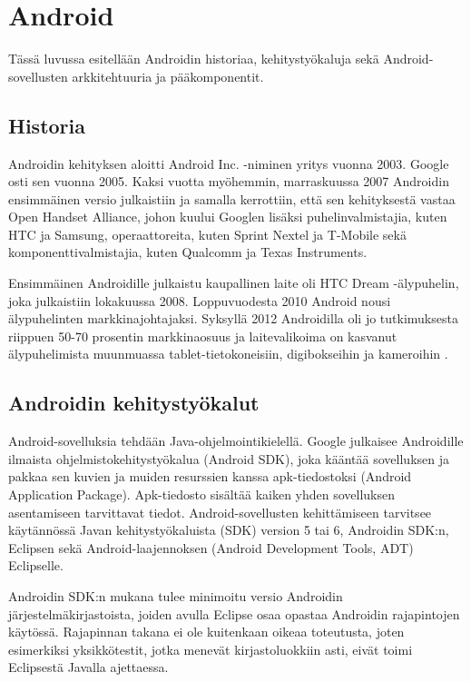 \section{Android}

Tässä luvussa esitellään Androidin historiaa, kehitystyökaluja sekä Android-sovellusten arkkitehtuuria ja pääkomponentit.

\subsection{Historia}

Androidin kehityksen aloitti Android Inc. -niminen yritys vuonna 2003. Google osti sen vuonna 2005. Kaksi vuotta myöhemmin, marraskuussa 2007 Androidin ensimmäinen versio julkaistiin ja samalla kerrottiin, että sen kehityksestä vastaa Open Handset Alliance, johon kuului Googlen lisäksi puhelinvalmistajia, kuten HTC ja Samsung, operaattoreita, kuten Sprint Nextel ja T-Mobile sekä komponenttivalmistajia, kuten Qualcomm ja Texas Instruments.

Ensimmäinen Androidille julkaistu kaupallinen laite oli HTC Dream -älypuhelin, joka julkaistiin lokakuussa 2008.
Loppuvuodesta 2010 Android nousi älypuhelinten markkinajohtajaksi. Syksyllä 2012 Androidilla oli jo tutkimuksesta riippuen 50-70 prosentin markkinaosuus ja laitevalikoima on kasvanut älypuhelimista muunmuassa tablet-tietokoneisiin, digibokseihin ja kameroihin \cite{wikiandroid}.

\subsection{Androidin kehitystyökalut}

Android-sovelluksia tehdään Java-ohjelmointikielellä. Google julkaisee Androidille ilmaista ohjelmistokehitystyökalua (Android SDK), joka kääntää sovelluksen ja pakkaa sen kuvien ja muiden resurssien kanssa apk-tiedostoksi (Android Application Package). Apk-tiedosto sisältää kaiken yhden sovelluksen asentamiseen tarvittavat tiedot. Android-sovellusten kehittämiseen tarvitsee käytännössä Javan kehitystyökaluista (SDK) version 5 tai 6, Androidin SDK:n, Eclipsen sekä Android-laajennoksen (Android Development Tools, ADT) Eclipselle.

Androidin SDK:n mukana tulee minimoitu versio Androidin järjestelmäkirjastoista, joiden avulla Eclipse osaa opastaa Androidin rajapintojen käytössä. Rajapinnan takana ei ole kuitenkaan oikeaa toteutusta, joten esimerkiksi yksikkötestit, jotka menevät kirjastoluokkiin asti, eivät toimi Eclipsestä Javalla ajettaessa.

